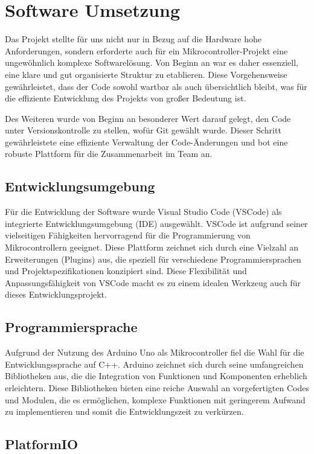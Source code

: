 \chapter{Software Umsetzung}

Das Projekt stellte für uns nicht nur in Bezug auf die Hardware hohe Anforderungen, sondern erforderte auch für ein Mikrocontroller-Projekt eine ungewöhnlich komplexe Softwarelösung. Von Beginn an war es daher essenziell, eine klare und gut organisierte Struktur zu etablieren. Diese Vorgehensweise gewährleistet, dass der Code sowohl wartbar als auch übersichtlich bleibt, was für die effiziente Entwicklung des Projekts von großer Bedeutung ist.

Des Weiteren wurde von Beginn an besonderer Wert darauf gelegt, den Code unter Versionskontrolle zu stellen, wofür Git gewählt wurde. Dieser Schritt gewährleistete eine effiziente Verwaltung der Code-Änderungen und bot eine robuste Plattform für die Zusammenarbeit im Team an.

\section{Entwicklungsumgebung}

Für die Entwicklung der Software wurde Visual Studio Code (VSCode) als integrierte Entwicklungsumgebung (IDE) ausgewählt. VSCode ist aufgrund seiner vielseitigen Fähigkeiten hervorragend für die Programmierung von Mikrocontrollern geeignet. Diese Plattform zeichnet sich durch eine Vielzahl an Erweiterungen (Plugins) aus, die speziell für verschiedene Programmiersprachen und Projektspezifikationen konzipiert sind. Diese Flexibilität und Anpassungsfähigkeit von VSCode macht es zu einem idealen Werkzeug auch für dieses Entwicklungsprojekt.

\section{Programmiersprache}

Aufgrund der Nutzung des Arduino Uno als Mikrocontroller fiel die Wahl für die Entwicklungssprache auf C++. Arduino zeichnet sich durch seine umfangreichen Bibliotheken aus, die die Integration von Funktionen und Komponenten erheblich erleichtern. Diese Bibliotheken bieten eine reiche Auswahl an vorgefertigten Codes und Modulen, die es ermöglichen, komplexe Funktionen mit geringerem Aufwand zu implementieren und somit die Entwicklungszeit zu verkürzen. 

\section{PlatformIO}

